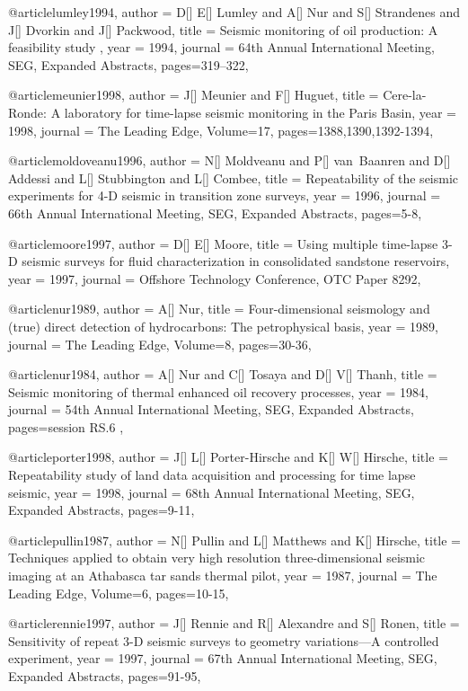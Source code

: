 @article{lumley1994,
  author =	 {D[] E[] Lumley and A[] Nur and S[] Strandenes and J[] Dvorkin and J[] Packwood},
  title =	 {Seismic monitoring of oil production: A feasibility study
},
  year =	 1994,
  journal =	 {64th Annual International Meeting, SEG, Expanded Abstracts},
 pages=319–322,
}

@article{meunier1998,
  author =	 {J[] Meunier and F[] Huguet},
  title =	 {Cere-la-Ronde: A laboratory for time-lapse seismic monitoring in the Paris Basin},
  year =	 1998,
  journal =	 {The Leading Edge},
    Volume=17,
 pages=1388,1390,1392-1394,
}

@article{moldoveanu1996,
  author =	 {N[] Moldveanu and P[] van~Baanren and D[] Addessi and L[] Stubbington and L[] Combee},
  title =	 {Repeatability of the seismic experiments for 4-D
seismic in transition zone surveys},
  year =	 1996,
  journal =	 {66th Annual International Meeting, SEG, Expanded Abstracts},
 pages=5-8,
}


@article{moore1997,
  author =	 {D[] E[] Moore},
  title =	 {Using multiple time-lapse 3-D seismic surveys for
fluid characterization in consolidated sandstone reservoirs},
  year =	 1997,
  journal =	 {Offshore Technology Conference, OTC Paper 8292},
}

@article{nur1989,
  author =	 {A[] Nur},
  title =	 {Four-dimensional seismology and (true) direct detection
of hydrocarbons: The petrophysical basis},
  year =	 1989,
  journal =	 {The Leading Edge},
    Volume=8,
 pages=30-36,
}

@article{nur1984,
  author =	 {A[] Nur and C[] Tosaya and D[] V[] Thanh},
  title =	 {Seismic monitoring of thermal enhanced oil recovery processes},
  year =	 1984,
  journal =	 {54th Annual International Meeting, SEG, Expanded Abstracts},
 pages=session RS.6
,
}

@article{porter1998,
  author =	 {J[] L[] Porter-Hirsche and K[] W[] Hirsche},
  title =	 {Repeatability study of land data acquisition and processing for time lapse seismic},
  year =	 1998,
  journal =	 {68th Annual International Meeting, SEG, Expanded Abstracts},
 pages=9-11,
}

@article{pullin1987,
  author =	 {N[] Pullin and L[] Matthews and K[] Hirsche},
  title =	 {Techniques applied to obtain very high resolution three-dimensional seismic imaging at an Athabasca tar sands thermal pilot},
  year =	 1987,
  journal =	 {The Leading Edge},
    Volume=6,
 pages=10-15,
}

@article{rennie1997,
  author =	 {J[] Rennie and R[] Alexandre and S[] Ronen},
  title =	 { Sensitivity of repeat 3-D seismic surveys to geometry variations—A controlled experiment},
  year =	 1997,
  journal =	 {67th Annual International Meeting, SEG, Expanded Abstracts},
 pages=91-95,
}


